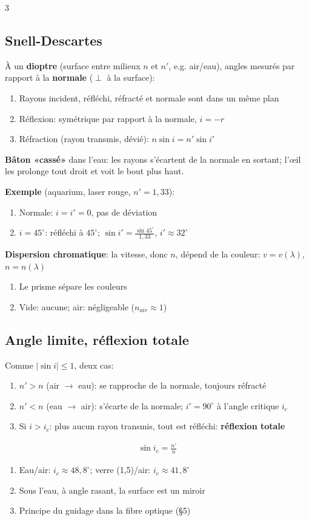 \documentclass[12pt, a4paper]{article}
\begin{document}
\begin{multicols*}{3}
	\subsection{Snell-Descartes}
	À un \textbf{dioptre} (surface entre milieux $n$ et $n'$, e.g. air/eau), angles mesurés par rapport à la \textbf{normale} ($\perp$ à la surface):
	\begin{enumerate}[\roman*.]
		\item Rayons incident, réfléchi, réfracté et normale sont dans un même plan
		\item Réflexion: symétrique par rapport à la normale, $i=-r$
		\item Réfraction (rayon transmis, dévié): $n\sin i=n'\sin i'$
	\end{enumerate}
	\textbf{Bâton «cassé»} dans l'eau: les rayons s'écartent de la normale en sortant; l'œil les prolonge tout droit et voit le bout plus haut.

	\textbf{Exemple} (aquarium, laser rouge, $n'=1{,}33$):
	\begin{enumerate}[\roman*.]
		\item Normale: $i=i'=0$, pas de déviation
		\item $i=45^\circ$: réfléchi à $45^\circ$; $\sin i'=\frac{\sin45^\circ}{1{,}33}$, $i'\approx32^\circ$
	\end{enumerate}

	\colbreak
	\textbf{Dispersion chromatique}: la vitesse, donc $n$, dépend de la couleur: $v=v(\lambda)$, $n=n(\lambda)$
	\begin{enumerate}[\roman*.]
		\item Le prisme sépare les couleurs
		\item Vide: aucune; air: négligeable ($n_{air}\approx1$)
	\end{enumerate}

	\subsection{Angle limite, réflexion totale}
	Comme $|\sin i|\leq1$, deux cas:
	\begin{enumerate}[\roman*.]
		\item $n'>n$ (air $\rightarrow$ eau): se rapproche de la normale, toujours réfracté
		\item $n'<n$ (eau $\rightarrow$ air): s'écarte de la normale; $i'=90^\circ$ à l'angle critique $i_c$
		\item Si $i>i_c$: plus aucun rayon transmis, tout est réfléchi: \textbf{réflexion totale}
	\end{enumerate}
	\begin{gather*}
		\sin i_c=\frac{n'}{n}
	\end{gather*}
	\begin{enumerate}[\roman*.]
		\item Eau/air: $i_c\approx48{,}8^\circ$; verre (1,5)/air: $i_c\approx41{,}8^\circ$
		\item Sous l'eau, à angle rasant, la surface est un miroir
		\item Principe du guidage dans la fibre optique (§5)
	\end{enumerate}


\end{multicols*}
\end{document}
